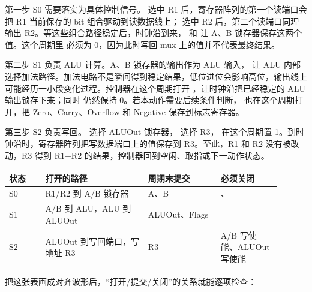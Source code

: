 第一步 S0 需要落实为具体控制信号。 选中 R1 后，寄存器阵列的第一个读端口会把 R1 当前保存的 bit 组合驱动到读数据线上； 选中 R2 后，第二个读端口同理输出 R2。等这些组合路径稳定后，时钟沿到来， 和  让 A、B 锁存器保存这两个值。这个周期里  必须为 0，因为此时写回 mux 上的值并不代表最终结果。

第二步 S1 负责 ALU 计算。A、B 锁存器的输出作为 ALU 输入， 让 ALU 内部选择加法路径。加法电路不是瞬间得到稳定结果，低位进位会影响高位，输出线上可能经历一小段变化过程。控制器在这个周期打开 ，让时钟沿把已经稳定的 ALU 输出锁存下来；同时  仍然保持 0。若本动作需要后续条件判断， 也在这个周期打开，把 Zero、Carry、Overflow 和 Negative 保存到标志寄存器。

第三步 S2 负责写回。 选择 ALUOut 锁存器， 选择 R3， 在这个周期置 1。到时钟沿时，寄存器阵列把写数据端口上的值保存到 R3。至此，R1 和 R2 没有被改动，R3 得到 R1+R2 的结果，控制器回到空闲、取指或下一动作状态。

\begin{longtable}{L{0.12\linewidth}L{0.34\linewidth}L{0.24\linewidth}L{0.2\linewidth}}
\toprule
状态 & 打开的路径 & 周期末提交 & 必须关闭 \\
\midrule
S0 & R1/R2 到 A/B 锁存器 & A、B & 、 \\\tablerowrule
S1 & A/B 到 ALU，ALU 到 ALUOut & ALUOut、Flags &  \\\tablerowrule
S2 & ALUOut 到写回端口，写地址 R3 & R3 & A/B 写使能、ALUOut 写使能 \\
\bottomrule
\end{longtable}

把这张表画成对齐波形后，“打开/提交/关闭”的关系就能逐项检查：

